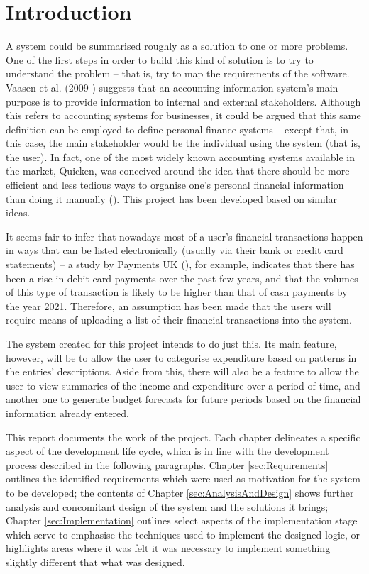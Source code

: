 \section{Introduction} \label{sec:Introduction}

A system could be summarised roughly as a solution to one or more problems. One
of the first steps in order to build this kind of solution is to try to
understand the problem -- that is, try to map the requirements of the software.
Vaasen et al. (2009 \cite[cited][p.~8]{Boczko:2012:IAI:2331376}) suggests that
an accounting information system's main purpose is to provide information to
internal and external stakeholders. Although this refers to accounting systems
for businesses, it could be argued that this same definition can be employed to
define personal finance systems -- except that, in this case, the main
stakeholder would be the individual using the system (that is, the user). In
fact, one of the most widely known accounting systems available in the market,
Quicken\texttrademark, was conceived around the idea that there should be more
efficient and less tedious ways to organise one's personal financial
information than doing it manually (\cite{quicken2017about}). This project has
been developed based on similar ideas.

It seems fair to infer that nowadays most of a user's financial transactions
happen in ways that can be listed electronically (usually via their bank or
credit card statements) -- a study by Payments UK
(\citeyear{paymentsUK2017summary}), for example, indicates that there has been
a rise in debit card payments over the past few years, and that the volumes of
this type of transaction is likely to be higher than that of cash payments by
the year 2021. Therefore, an assumption has been made that the users will
require means of uploading a list of their financial transactions into the
system.

The system created for this project intends to do just this. Its main feature,
however, will be to allow the user to categorise expenditure based on patterns
in the entries' descriptions. Aside from this, there will also be a feature to
allow the user to view summaries of the income and expenditure over a period of
time, and another one to generate budget forecasts for future periods based on
the financial information already entered.

This report documents the work of the project. Each chapter delineates a
specific aspect of the development life cycle, which is in line with the
development process described in the following paragraphs. Chapter
\ref{sec:Requirements} outlines the identified requirements which were used as
motivation for the system to be developed; the contents of Chapter
\ref{sec:AnalysisAndDesign} shows further analysis and concomitant design of
the system and the solutions it brings; Chapter \ref{sec:Implementation}
outlines select aspects of the implementation stage which serve to emphasise
the techniques used to implement the designed logic, or highlights areas where
it was felt it was necessary to implement something slightly different that
what was designed.

